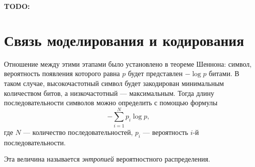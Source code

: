 \textbf{TODO:}

\section{Связь моделирования и кодирования}

Отношение между этими этапами было установлено в теореме Шеннона: символ, вероятность появления которого равна $p$ будет представлен \begin{math}-\log{p}\end{math} битами.
В таком случае, высокочастотный символ будет закодирован минимальным количеством битов, а низкочастотный --- максимальным. Тогда длину последовательности символов можно определить с помощью формулы
\begin{equation}\label{entropy}
   -\displaystyle\sum_{i=1}^{N}p_{i}\log{p},
\end{equation}
где $N$ --- количество последовательностей, $p_{i}$ --- вероятность $i$-й последовательности.

Эта величина называется \textit{энтропией} вероятностного распределения.